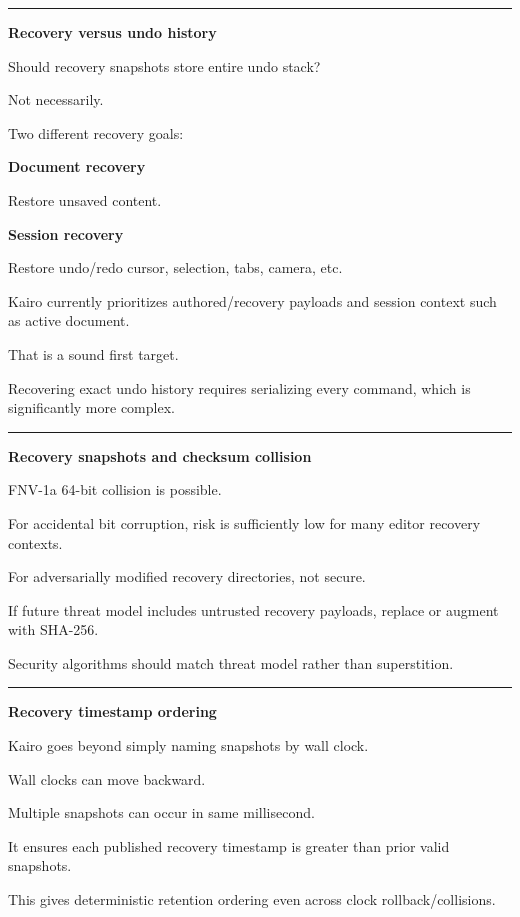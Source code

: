 \begin{center}\rule{0.5\linewidth}{0.5pt}\end{center}

\textbf{Recovery versus undo history}

Should recovery snapshots store entire undo stack?

Not necessarily.

Two different recovery goals:

\textbf{Document recovery}

Restore unsaved content.

\textbf{Session recovery}

Restore undo/redo cursor, selection, tabs, camera, etc.

Kairo currently prioritizes authored/recovery payloads and session context such as active document.

That is a sound first target.

Recovering exact undo history requires serializing every command, which is significantly more complex.

\begin{center}\rule{0.5\linewidth}{0.5pt}\end{center}

\textbf{Recovery snapshots and checksum collision}

FNV-1a 64-bit collision is possible.

For accidental bit corruption, risk is sufficiently low for many editor recovery contexts.

For adversarially modified recovery directories, not secure.

If future threat model includes untrusted recovery payloads, replace or augment with SHA-256.

Security algorithms should match threat model rather than superstition.

\begin{center}\rule{0.5\linewidth}{0.5pt}\end{center}

\textbf{Recovery timestamp ordering}

Kairo goes beyond simply naming snapshots by wall clock.

Wall clocks can move backward.

Multiple snapshots can occur in same millisecond.

It ensures each published recovery timestamp is greater than prior valid snapshots.

This gives deterministic retention ordering even across clock rollback/collisions.


